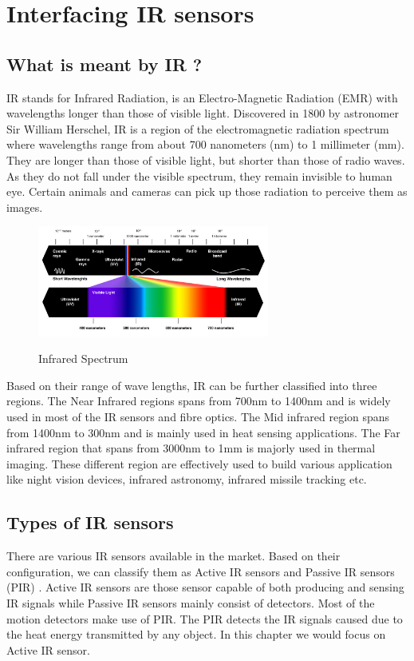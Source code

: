 \chapter{Interfacing IR sensors}
\label{ch:ir-sensors}

\section{What is meant by IR ?}
IR stands for Infrared Radiation, is an Electro-Magnetic Radiation (EMR) with wavelengths longer than those of visible light. Discovered in 1800 by astronomer Sir William Herschel, IR is a region of the electromagnetic radiation spectrum where wavelengths range from about 700 nanometers (nm) to 1 millimeter (mm). They are longer than those of visible light, but shorter than those of radio waves. As they do not fall under the visible spectrum, they remain invisible to human eye. Certain animals and cameras can pick up those radiation to perceive them as images.
\hspace{2cm}
\begin{figure}[h!]	
	\centering
	\includegraphics[width=3in]{Chapters/images/IR_spectrum.png}\\
	\caption{Infrared Spectrum}
	\label{fig:1}
\end{figure}

Based on their range of wave lengths, IR can be further classified into three regions. The Near Infrared regions spans from 700nm to 1400nm and is widely used in most of the IR sensors and fibre optics. The Mid infrared region spans from 1400nm to 300nm and is mainly used in heat sensing applications. The Far infrared region that spans from 3000nm to 1mm is majorly used in thermal imaging. These different region are effectively used to build various application like night vision devices, infrared astronomy, infrared missile tracking etc.


\section{Types of IR sensors}
There are various IR sensors available in the market. Based on their configuration, we can classify them as Active IR sensors and Passive IR sensors (PIR) . Active IR sensors are those sensor capable of both producing and sensing IR signals while Passive IR sensors mainly consist of detectors. Most of the motion detectors make use of PIR. The PIR detects the IR signals caused due to the heat energy transmitted by any object. In this chapter we would focus on Active IR sensor.

